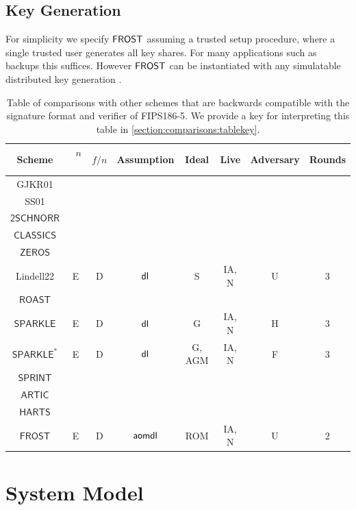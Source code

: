 \subsection{Key Generation}\label{section:comparisons:keygeneration}
For simplicity we specify $\mathsf{FROST}$ assuming a trusted setup procedure, where a single trusted user generates all key shares.
For many applications such as backups this suffices.
However  $\mathsf{FROST}$ can be instantiated with any simulatable distributed key generation \cite{}.

\begin{table}[htbp]
	\centering
	\begin{tabular}{c c c c c c c c}
		\toprule
		Scheme & \ $n$ \ & $f/n$ & Assumption & Ideal & Live & Adversary & Rounds \\ \midrule
		GJKR01 \cite{GennaroJKR01}& & & & & & & \\
		SS01 \cite{StinsonS01} & & & & &  & & \\
		$\mathsf{2SCHNORR}$ & & & & & &  & \\
		$\mathsf{CLASSICS}$ & & & & & & & \\
		$\mathsf{ZEROS}$ & & & & & &   & \\
		Lindell22 \cite{Lindell22} & E & D & $\mathsf{dl}$ & S &  IA, N & U & $3$ \\
		$\mathsf{ROAST}$ & & & & &  & & \\
		$\mathsf{SPARKLE}$ & E & D & $\mathsf{dl}$ & G & IA, N & H & $3$ \\
		$\mathsf{SPARKLE}^*$ & E & D & $\mathsf{dl}$ & G, AGM & IA, N & F & $3$ \\
		$\mathsf{SPRINT}$ & & & & & &  & \\
		$\mathsf{ARTIC}$ & & & & & &  & \\
		$\mathsf{HARTS}$ & & & & & &  & \\
		\midrule
		$\mathsf{FROST}$ & E & D & $\mathsf{aomdl}$ & ROM & IA, N & U & $2$ \\
		\bottomrule
	\end{tabular}
	\caption{\label{table:comparisons}
		Table of comparisons with other schemes that are backwards compatible with the signature format and verifier of FIPS186-5.
		We provide a key for interpreting this table in \cref{section:comparisons:tablekey}.
	 }
\end{table}


\section{System Model}\label{section:system-model}


